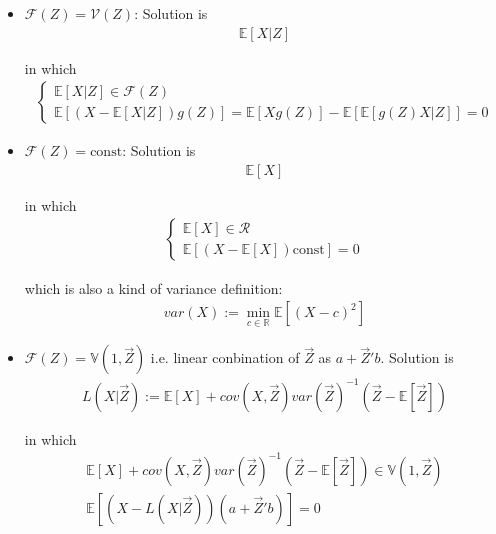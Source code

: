 \begin{itemize}[topsep=2pt,itemsep=0pt]
    \item $ \mathscr{F}(Z)=\mathscr{V}(Z) $: Solution is 
    \begin{align*}
        \mathbb{E}\left[ X|Z \right] 
    \end{align*}
    
    in which
    \begin{align*}
        \begin{cases}
            \mathbb{E}\left[ X|Z \right] \in\mathscr{F}(Z)\\
            \mathbb{E}\left[(X-\mathbb{E}\left[ X|Z \right] )g(Z) \right]=\mathbb{E}\left[ Xg(Z) \right] -\mathbb{E}\left[ \mathbb{E}\left[ g(Z)X|Z \right]  \right] =0 
        \end{cases} 
    \end{align*}
    \item $ \mathscr{F}(Z)=\mathrm{const} $: Solution is
    \begin{align*}
         \mathbb{E}\left[ X \right]  
    \end{align*}
    
    in which
    \begin{align*}
        \begin{cases}
            \mathbb{E}\left[ X \right]\in \mathcal{R}\\
            \mathbb{E}\left[ (X-\mathbb{E}\left[ X \right] )\mathrm{const} \right]=0 
        \end{cases} 
    \end{align*}

    which is also a kind of variance definition:
    \begin{align*}
        var(X):=\min_{c\in\mathbb{R}}\mathbb{E}\left[ (X-c)^2 \right]  
    \end{align*}
    
    \item \hypertarget{MMSELinear}{}$ \mathscr{F}(Z)=\mathbb{V}(1,\vec{Z}) $ i.e. linear conbination of $ \vec{Z} $ as $ a+\vec{Z}'b $. Solution is
    \begin{align*}
        L(X|\vec{Z}):=\mathbb{E}\left[ X \right] +cov(X,\vec{Z})var(\vec{Z})^{-1}\left(\vec{Z}-\mathbb{E}\left[ \vec{Z} \right] \right)
    \end{align*}
    
    in which
    \begin{align*}
        \mathbb{E}\left[ X \right] +cov(X,\vec{Z})var(\vec{Z})^{-1}\left(\vec{Z}-\mathbb{E}\left[ \vec{Z} \right] \right)\in \mathbb{V}(1,\vec{Z})\\
        \mathbb{E}\left[ (X-L(X|\vec{Z}))(a+\vec{Z}'b) \right] = 0
    \end{align*}
    
\end{itemize}



